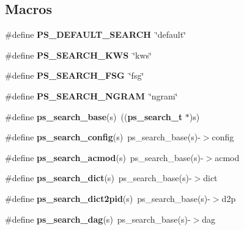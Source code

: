 \subsection*{Macros}
\begin{DoxyCompactItemize}
\item 
\#define {\bfseries P\+S\+\_\+\+D\+E\+F\+A\+U\+L\+T\+\_\+\+S\+E\+A\+R\+C\+H}~\char`\"{}default\char`\"{}\label{pocketsphinx__internal_8h_a84a97dd05f15264c6949498feb139671}

\item 
\#define {\bfseries P\+S\+\_\+\+S\+E\+A\+R\+C\+H\+\_\+\+K\+W\+S}~\char`\"{}kws\char`\"{}\label{pocketsphinx__internal_8h_ace7921a5c754395cdf2d197039553b05}

\item 
\#define {\bfseries P\+S\+\_\+\+S\+E\+A\+R\+C\+H\+\_\+\+F\+S\+G}~\char`\"{}fsg\char`\"{}\label{pocketsphinx__internal_8h_a95d43c0bca0e340b57d679dcd84a8fd0}

\item 
\#define {\bfseries P\+S\+\_\+\+S\+E\+A\+R\+C\+H\+\_\+\+N\+G\+R\+A\+M}~\char`\"{}ngram\char`\"{}\label{pocketsphinx__internal_8h_adc5ecfa80f4969c3ff1faa08f3cc001a}

\item 
\#define {\bfseries ps\+\_\+search\+\_\+base}(s)~(({\bf ps\+\_\+search\+\_\+t} $\ast$)s)\label{pocketsphinx__internal_8h_a27058b099b21336e1fd50299f8596171}

\item 
\#define {\bfseries ps\+\_\+search\+\_\+config}(s)~ps\+\_\+search\+\_\+base(s)-\/$>$config\label{pocketsphinx__internal_8h_a856f984d97ce3d4ac640f1a9061065cf}

\item 
\#define {\bfseries ps\+\_\+search\+\_\+acmod}(s)~ps\+\_\+search\+\_\+base(s)-\/$>$acmod\label{pocketsphinx__internal_8h_a03b1edeb67c83451296c2d99b22621a9}

\item 
\#define {\bfseries ps\+\_\+search\+\_\+dict}(s)~ps\+\_\+search\+\_\+base(s)-\/$>$dict\label{pocketsphinx__internal_8h_ae2aad02cace01fbb2f345a0ead69c672}

\item 
\#define {\bfseries ps\+\_\+search\+\_\+dict2pid}(s)~ps\+\_\+search\+\_\+base(s)-\/$>$d2p\label{pocketsphinx__internal_8h_a5c91d7c3f11ba5b938705d1fe65676f9}

\item 
\#define {\bfseries ps\+\_\+search\+\_\+dag}(s)~ps\+\_\+search\+\_\+base(s)-\/$>$dag\label{pocketsphinx__internal_8h_a90e5addd9875c355d99208246802f7d8}


\end{DoxyCompactItemize}
